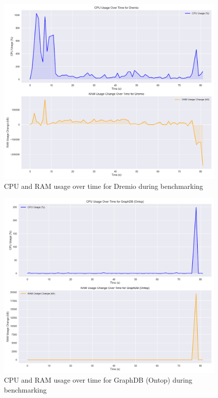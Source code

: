 \begin{figure}[!ht] 
    \centering 
    \includegraphics[width=11.6cm]{res/Dremio_usage_plot.png} 
    \caption{\ac{CPU} and \ac{RAM} usage over time for Dremio during benchmarking} 
    \label{fig:bench_Dremio}
\end{figure}
\begin{figure}[!ht] 
    \centering 
    \includegraphics[width=11.6cm]{res/GraphDB (Ontop)_usage_plot.png} 
    \caption{\ac{CPU} and \ac{RAM} usage over time for GraphDB (Ontop) during benchmarking} 
    \label{fig:bench_GraphDB}
\end{figure}

